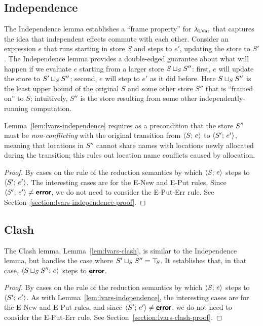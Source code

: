 \subsection{Independence}\label{subsection:lvars-independence}

The Independence lemma establishes a ``frame property'' for
$\lambda_{\textrm{LVar}}$ that captures the idea that independent effects commute
with each other.  Consider an expression $e$ that runs starting in
store $S$ and steps to $e'$, updating the store to $S'$.  The
Independence lemma provides a double-edged guarantee about what will
happen if we evaluate $e$ starting from a larger store
$S \sqcup_{S} S''$: first, $e$ will update the store to
$S' \sqcup_{S} S''$; second, $e$ will step to $e'$ as it did before.
Here $S \sqcup_{S} S''$ is the least upper bound of the original $S$
and some other store $S''$ that is ``framed on'' to $S$; intuitively,
$S''$ is the store resulting from some other independently-running
computation.

Lemma~\ref{lem:lvars-independence} requires as a precondition that the
store $S''$ must be \emph{non-conflicting} with the original
transition from $\langle S;\, e \rangle$ to $\langle S';\, e' \rangle$, meaning that
locations in $S''$ cannot share names with locations newly allocated
during the transition; this rules out location name conflicts caused
by allocation.

\LVarsDefNonConflicting

\LVarsLemIndependence
\begin{proof}
  By cases on the rule of the reduction semantics by which
  $\langle S;\, e \rangle$ steps to $\langle S';\, e' \rangle$. The interesting cases
  are for the {\sc E-New} and {\sc E-Put} rules.  Since
  $\langle S';\, e' \rangle \neq \textbf{\textsf{error}}$, we do not need to consider the {\sc
    E-Put-Err} rule.  See
  Section~\ref{section:lvars-independence-proof}.
\end{proof}

\subsection{Clash}

The Clash lemma, Lemma~\ref{lem:lvars-clash}, is similar to the
Independence lemma, but handles the case where $S' \sqcup_{S} S'' =
\top\hspace{-0.85mm}_{S}$.  It establishes that, in that case,
$\langle S \sqcup_{S} S'';\, e \rangle$ steps to $\textbf{\textsf{error}}$.

\LVarsLemClash
\begin{proof}
  By cases on the rule of the reduction semantics by which
  $\langle S;\, e \rangle$ steps to $\langle S';\, e' \rangle$. As with
  Lemma~\ref{lem:lvars-independence}, the interesting cases are for
  the {\sc E-New} and {\sc E-Put} rules, and since $\langle S';\, e' \rangle
  \neq \textbf{\textsf{error}}$, we do not need to consider the {\sc E-Put-Err} rule.
  See Section~\ref{section:lvars-clash-proof}.
\end{proof}

